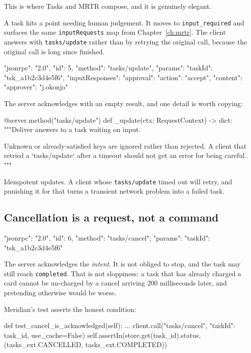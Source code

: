 This is where Tasks and MRTR compose, and it is genuinely elegant.

A task hits a point needing human judgement. It moves to
\texttt{input\_required} and surfaces the same \texttt{inputRequests} map from
Chapter~\ref{ch:mrtr}. The client answers with \texttt{tasks/update} rather than
by retrying the original call, because the original call is long since finished.

\begin{wire}
{
  "jsonrpc": "2.0",
  "id": 5,
  "method": "tasks/update",
  "params": {
    "taskId": "tsk_a1b2c3d4e5f6",
    "inputResponses": {
      "approval": { "action": "accept",
                    "content": { "approver": "j.okonjo" } }
    }
  }
}
\end{wire}

The server acknowledges with an empty result, and one detail is worth copying:

\begin{py}
@server.method("tasks/update")
def _update(ctx: RequestContext) -> dict:
    """Deliver answers to a task waiting on input.

    Unknown or already-satisfied keys are ignored rather than rejected. A
    client that retried a `tasks/update` after a timeout should not get an
    error for being careful.
    """
\end{py}

Idempotent updates. A client whose \texttt{tasks/update} timed out will retry,
and punishing it for that turns a transient network problem into a failed task.

\subsection{Cancellation is a request, not a command}

\begin{wire}
{ "jsonrpc": "2.0", "id": 6, "method": "tasks/cancel",
  "params": { "taskId": "tsk_a1b2c3d4e5f6" } }
\end{wire}

The server acknowledges the \emph{intent}. It is not obliged to stop, and the
task may still reach \texttt{completed}. That is not sloppiness: a task that has
already charged a card cannot be un-charged by a cancel arriving 200
milliseconds later, and pretending otherwise would be worse.

Meridian's test asserts the honest condition:

\begin{py}
def test_cancel_is_acknowledged(self):
    ...
    client.call("tasks/cancel", {"taskId": task_id}, use_cache=False)
    self.assertIn(store.get(task_id).status,
                  (tasks_ext.CANCELLED, tasks_ext.COMPLETED))
\end{py}

